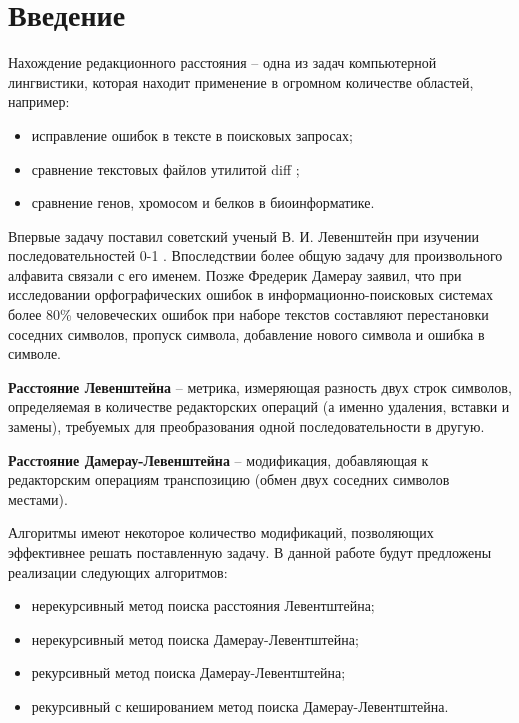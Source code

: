 \chapter*{Введение}

Нахождение редакционного расстояния -- одна из задач компьютерной лингвистики, которая находит применение в огромном количестве областей, например:
\begin{itemize}
	\item исправление ошибок в тексте в поисковых запросах;
    \item сравнение текстовых файлов утилитой diff \cite{diff};
    \item сравнение генов, хромосом и белков в биоинформатике.
\end{itemize}

Впервые задачу поставил советский ученый В. И. Левенштейн при изучении последовательностей 0-1 \cite{levenshtein}.
Впоследствии более общую задачу для произвольного алфавита связали с его именем.
Позже Фредерик Дамерау заявил, что при исследовании орфографических ошибок в информационно-поисковых системах более 80\% человеческих ошибок при наборе текстов составляют перестановки соседних символов, пропуск символа, добавление нового символа и ошибка в символе.

\textbf{Расстояние Левенштейна} -- метрика, измеряющая разность двух строк символов, определяемая в количестве редакторских операций (а именно удаления, вставки и замены), требуемых для преобразования одной последовательности в другую.

\textbf{Расстояние Дамерау-Левенштейна} -- модификация, добавляющая к редакторским операциям транспозицию (обмен двух соседних символов местами).

Алгоритмы имеют некоторое количество модификаций, позволяющих эффективнее решать поставленную задачу.
В данной работе будут предложены реализации следующих алгоритмов:
\begin{itemize}
	\item нерекурсивный метод поиска расстояния Левентштейна;
    \item нерекурсивный метод поиска Дамерау-Левентштейна;
    \item рекурсивный метод поиска Дамерау-Левентштейна;
    \item рекурсивный с кешированием метод поиска Дамерау-Левентштейна.
\end{itemize}

\clearpage

